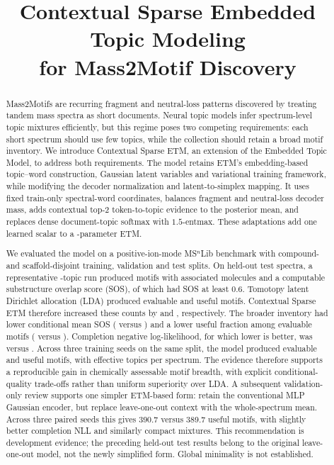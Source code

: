 \documentclass[10pt,a4paper]{article}
\title{Contextual Sparse Embedded Topic Modeling\\
for Mass2Motif Discovery}
\author{}
\date{}
\begin{document}
\maketitle
\thispagestyle{titlepage}
\pagestyle{fancy}

\begin{abstract}
Mass2Motifs are recurring fragment and neutral-loss patterns discovered by
treating tandem mass spectra as short documents. Neural topic models infer
spectrum-level topic mixtures efficiently, but this regime poses two competing
requirements: each short spectrum should use few topics, while the collection
should retain a broad motif inventory. We introduce Contextual Sparse ETM, an
extension of the Embedded Topic Model, to address both requirements. The model
retains ETM's embedding-based topic--word construction, Gaussian latent
variables and variational training framework, while modifying the decoder
normalization and latent-to-simplex mapping.
It uses fixed train-only spectral-word coordinates, balances fragment and
neutral-loss decoder mass, adds contextual top-2 token-to-topic evidence to the
posterior mean, and replaces dense document-topic softmax with $1.5$-entmax.
These adaptations add one learned scalar to a \BaseParameters-parameter ETM.

We evaluated the model on a positive-ion-mode MS$^{n}$Lib benchmark with
compound- and scaffold-disjoint training, validation and test splits. On
\TestSpectra{} held-out test spectra, a representative \StudyTopics-topic run
produced \ContextualEvaluable{} motifs with associated molecules and a
computable substructure overlap score (SOS), of which \ContextualUseful{} had
SOS at least 0.6. Tomotopy latent Dirichlet allocation (LDA) produced
\TomotopyEvaluable{} evaluable and \TomotopyUseful{} useful motifs. Contextual
Sparse ETM therefore increased these counts by
\ContextualEvaluableGainVsTomotopy{} and
\ContextualUsefulGainVsTomotopy{}, respectively. The broader inventory had
lower conditional mean SOS (\ContextualMeanSOS{} versus \TomotopyMeanSOS{}) and
a lower useful fraction among evaluable motifs (\ContextualUsefulRate{} versus
\TomotopyUsefulRate{}). Completion negative log-likelihood, for which lower is
better, was \ContextualNLL{} versus \TomotopyNLL{}. Across three training seeds
on the same split, the model produced \StabilityEvaluableRange{} evaluable and
\StabilityUsefulRange{} useful motifs, with
\StabilityMedianEffectiveRange{} effective topics per spectrum. The evidence
therefore supports a reproducible gain in chemically assessable motif breadth,
with explicit conditional-quality trade-offs rather than uniform superiority
over LDA. A subsequent validation-only review supports one simpler ETM-based
form: retain the conventional MLP Gaussian encoder, but replace leave-one-out
context with the whole-spectrum mean. Across three paired seeds this gives
390.7 versus 389.7 useful motifs, with slightly better completion NLL and
similarly compact mixtures. This recommendation is development evidence;
the preceding held-out test results belong to the original leave-one-out
model, not the newly simplified form. Global minimality is not established.
\end{abstract}
\end{document}

